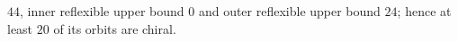 $44$, inner reflexible upper bound $0$ and outer reflexible upper bound $24$; hence at least $20$ of its orbits are chiral.
